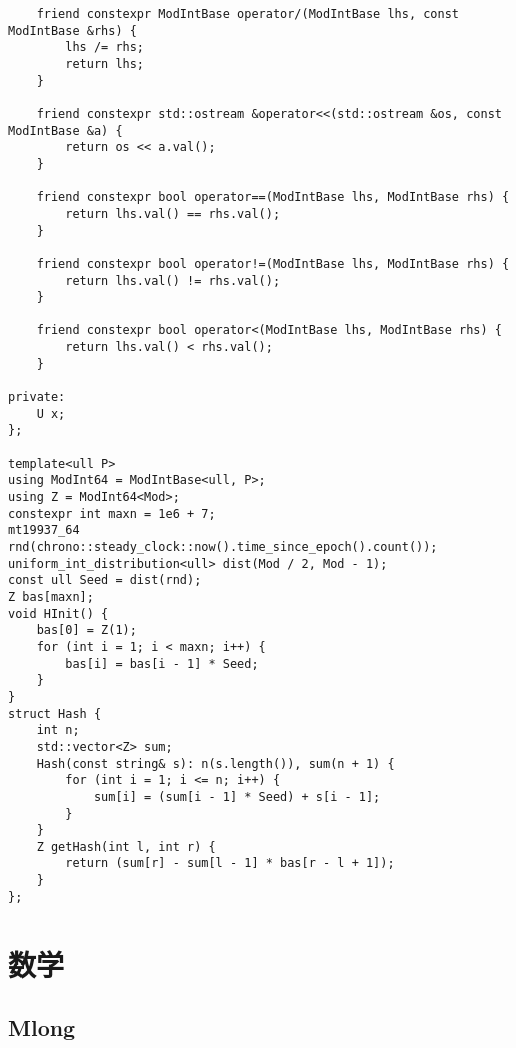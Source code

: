 \documentclass[a4paper,10pt]{article}
\begin{document}
\begin{lstlisting}
    friend constexpr ModIntBase operator/(ModIntBase lhs, const ModIntBase &rhs) {
        lhs /= rhs;
        return lhs;
    }

    friend constexpr std::ostream &operator<<(std::ostream &os, const ModIntBase &a) {
        return os << a.val();
    }

    friend constexpr bool operator==(ModIntBase lhs, ModIntBase rhs) {
        return lhs.val() == rhs.val();
    }

    friend constexpr bool operator!=(ModIntBase lhs, ModIntBase rhs) {
        return lhs.val() != rhs.val();
    }

    friend constexpr bool operator<(ModIntBase lhs, ModIntBase rhs) {
        return lhs.val() < rhs.val();
    }

private:
    U x;
};

template<ull P>
using ModInt64 = ModIntBase<ull, P>;
using Z = ModInt64<Mod>;
constexpr int maxn = 1e6 + 7;
mt19937_64 rnd(chrono::steady_clock::now().time_since_epoch().count());
uniform_int_distribution<ull> dist(Mod / 2, Mod - 1);
const ull Seed = dist(rnd);
Z bas[maxn];
void HInit() {
    bas[0] = Z(1);
    for (int i = 1; i < maxn; i++) {
        bas[i] = bas[i - 1] * Seed;
    }
}
struct Hash {
    int n;
    std::vector<Z> sum;
    Hash(const string& s): n(s.length()), sum(n + 1) {
        for (int i = 1; i <= n; i++) {
            sum[i] = (sum[i - 1] * Seed) + s[i - 1];
        }
    }
    Z getHash(int l, int r) {
        return (sum[r] - sum[l - 1] * bas[r - l + 1]);
    }
};\end{lstlisting}

\section{数学}
\thispagestyle{fancy}

\subsection{Mlong}
\thispagestyle{fancy}
\end{document}
